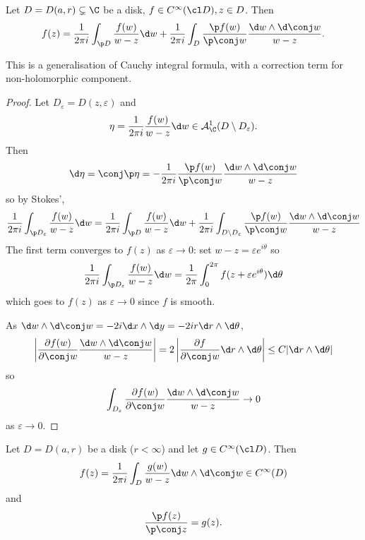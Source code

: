 \documentclass[a4paper]{article}
\newcommand{\w}{\wedge} %
\begin{document}
\begin{proposition}
  Let \(D = D(a, r) \subsetneq \C\) be a disk, \(f \in C^\infty(\cl D), z \in D\). Then
  \[
    f(z) = \frac{1}{2\pi i} \int_{\p D}\frac{f(w)}{w - z} \d w + \frac{1}{2\pi i} \int_D \frac{\p f(w)}{\p \conj w} \frac{\d w \w \d \conj w}{w - z}.
  \]
\end{proposition}
This is a generalisation of Cauchy integral formula, with a correction term for non-holomorphic component.

\begin{proof}
  Let \(D_\varepsilon = D(z, \varepsilon)\) and
  \[
    \eta = \frac{1}{2\pi i} \frac{f(w)}{w - z} \d w \in \mathcal A_\C^1 (D \setminus D_\varepsilon).
  \]
  Then
  \[
    \d\eta
    = \conj \p \eta
    = -\frac{1}{2\pi i} \frac{\p f(w)}{\p \conj w} \frac{\d w \w \d \conj w}{w - z}
  \]
  so by Stokes',
  \[
    \frac{1}{2\pi i} \int_{\p D_\varepsilon} \frac{f(w)}{w - z} \d w
    = \frac{1}{2\pi i} \int_{\p D} \frac{f(w)}{w - z} \d w + \frac{1}{2\pi i} \int_{D \setminus D_\varepsilon} \frac{\p f(w)}{\p \conj w} \frac{\d w \w \d \conj w}{w - z}
  \]
  The first term converges to \(f(z)\) as \(\varepsilon \to 0\): set \(w - z = \varepsilon e^{i\theta}\) so
  \[
    \frac{1}{2\pi i} \int_{\p D_\varepsilon} \frac{f(w)}{w - z} \d w
    = \frac{1}{2\pi} \int_0^{2\pi} f(z + \varepsilon e^{i\theta}) \d\theta
  \]
  which goes to \(f(z)\) as \(\varepsilon \to 0\) since \(f\) is smooth.

  As \(\d w \w \d \conj w = -2i \d x \w \d y = -2ir \d r \w \d \theta\),
  \[
    \left| \frac{\partial f(w)}{\partial \conj w}  \frac{\d w \w \d \conj w}{w - z} \right|
    = 2 \left| \frac{\partial f}{\partial \conj w} \d r \w \d\theta \right|
    \leq C |\d r \w \d\theta|
  \]
  so
  \[
    \int_{D_\varepsilon} \frac{\partial f(w)}{\partial \conj w} \frac{\d w \w \d \conj w}{w - z}
    \to 0
  \]
  as \(\varepsilon \to 0\).
\end{proof}

\begin{theorem}
  Let \(D = D(a, r)\) be a disk (\(r < \infty\)) and let \(g \in C^\infty(\cl D)\). Then
  \[
    f(z) = \frac{1}{2\pi i} \int_D \frac{g(w)}{w - z} \d w \w \d \conj w \in C^\infty(D)
  \]
  and
  \[
    \frac{\p f(z)}{\p \conj z} = g(z).
  \]
\end{theorem}
\end{document}
